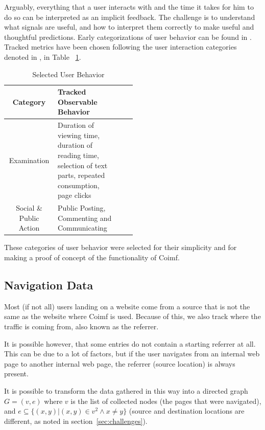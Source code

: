 \documentclass[sigconf,nonacm]{acmart}
\begin{document}
Arguably, everything that a user interacts with and the time it takes for him to
do so can be interpreted as an implicit feedback. The challenge is to understand
what signals are useful, and how to interpret them correctly to make useful and
thoughtful predictions. Early categorizations of user behavior can be found in
\cite{nichols1998implicit, Oard1998ImplicitFF}. Tracked metrics have been chosen
following the user interaction categories denoted in \cite{lerche2016using},
in Table ~\ref{tbl:selected-user-behavior}.
\begin{table}[h]
  \centering

  \begin{tabular}{ | cp{0.5 \linewidth} | cp{\linewidth} }
    \hline
    Category                & Tracked Observable Behavior                         \\ \hline
    Examination             & Duration of viewing time, duration of reading time,
    selection of text parts, repeated consumption, page clicks                    \\
    Social \& Public Action & Public Posting, Commenting and Communicating        \\
    \hline
  \end{tabular}

  \caption{Selected User Behavior}
  \label{tbl:selected-user-behavior}
\end{table}

These categories of user behavior were selected for their simplicity and for
making a proof of concept of the functionality of Coimf.

\subsection{Navigation Data}

Most (if not all) users landing on a website come from a source that is not the
same as the website where Coimf is used. Because of this, we also track where
the traffic is coming from, also known as the referrer.

It is possible however, that some entries do not contain a starting referrer at all. This can be due to a lot of
factors, but if the user navigates from an internal web page to another internal
web page, the referrer (source location) is always present.

It is possible to transform the data gathered in this way into a directed
graph $G = (v, e)$ where $v$ is the list of collected nodes (the pages that were
navigated), and $e \subseteq \{ (x, y) | (x, y) \in v^2 \land x \neq y \}$
(source and destination locations are different, as noted in
section~\ref{sec:challenges}).
\end{document}
